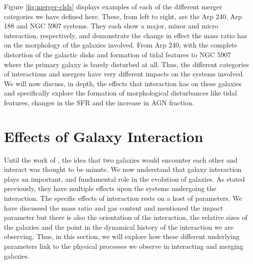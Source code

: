 Figure \ref{fig:merger-clsfs} displays examples of each of the different merger categories we have defined here. These, from left to right, are the Arp 240, Arp 188 and NGC 5907 systems. They each show a major, minor and micro interaction, respectively, and demonstrate the change in effect the mass ratio has on the morphology of the galaxies involved. From Arp 240, with the complete distortion of the galactic disks and formation of tidal features to NGC 5907 where the primary galaxy is barely disturbed at all. Thus, the different categories of interactions and mergers have very different impacts on the systems involved. We will now discuss, in depth, the effects that interaction has on these galaxies and specifically explore the formation of morphological disturbances like tidal features, changes in the SFR and the increase in AGN fraction.

\section{Effects of Galaxy Interaction}\label{sec:int_effects}
Until the work of \citet{1972ApJ...178..623T}, the idea that two galaxies would encounter each other and interact was thought to be minute. We now understand that galaxy interaction plays an important, and fundamental role in the evolution of galaxies. As stated previously, they have multiple effects upon the systems undergoing the interaction. The specific effects of interaction rests on a host of parameters. We have discussed the mass ratio and gas content and mentioned the impact parameter but there is also the orientation of the interaction, the relative sizes of the galaxies and the point in the dynamical history of the interaction we are observing. Thus, in this section, we will explore how these different underlying parameters link to the physical processes we observe in interacting and merging galaxies.

